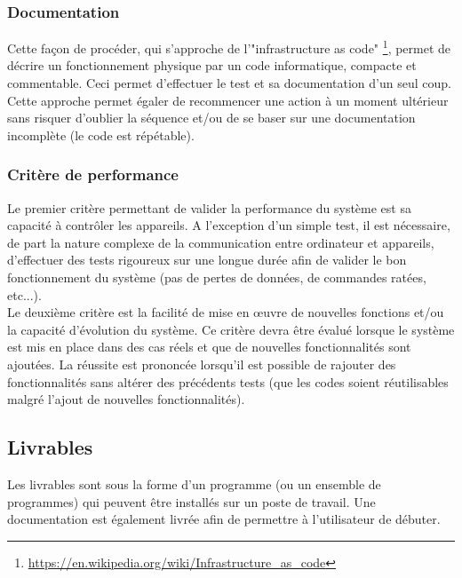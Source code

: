 \documentclass[AdvProjMgmt_Sebastien_Deriaz]{subfiles}
\begin{document}
\subsubsection{Documentation}
Cette façon de procéder, qui s'approche de l'"infrastructure as code" \footnote{\url{https://en.wikipedia.org/wiki/Infrastructure\_as\_code}}, permet de décrire un fonctionnement physique par un code informatique, compacte et commentable. Ceci permet d'effectuer le test et sa documentation d'un seul coup. Cette approche permet égaler de recommencer une action à un moment ultérieur sans risquer d'oublier la séquence et/ou de se baser sur une documentation incomplète (le code est répétable).
\subsubsection{Critère de performance}
Le premier critère permettant de valider la performance du système est sa capacité à contrôler les appareils. A l'exception d'un simple test, il est nécessaire, de part la nature complexe de la communication entre ordinateur et appareils, d'effectuer des tests rigoureux sur une longue durée afin de valider le bon fonctionnement du système (pas de pertes de données, de commandes ratées, etc...).\\
Le deuxième critère est la facilité de mise en œuvre de nouvelles fonctions et/ou la capacité d'évolution du système. Ce critère devra être évalué lorsque le système est mis en place dans des cas réels et que de nouvelles fonctionnalités sont ajoutées. La réussite est prononcée lorsqu'il est possible de rajouter des fonctionnalités sans altérer des précédents tests (que les codes soient réutilisables malgré l'ajout de nouvelles fonctionnalités).
\subsection{Livrables}
Les livrables sont sous la forme d'un programme (ou un ensemble de programmes) qui peuvent être installés sur un poste de travail. Une documentation est également livrée afin de permettre à l'utilisateur de débuter.
\end{document}
